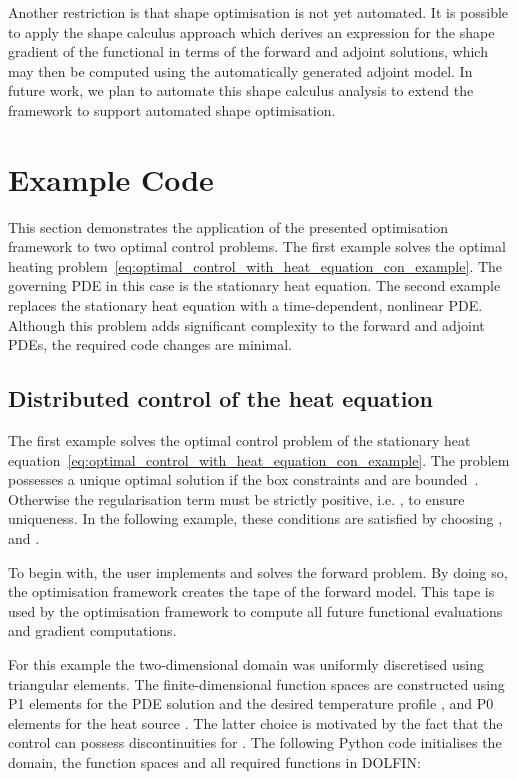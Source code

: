 \documentclass[prodmode,acmtoms]{acmsmall}
\newcommand{\dolfin}{{\mbox{DOLFIN}}\xspace}
\newcommand{\ponecg}{\mbox{P1}\xspace}
\newcommand{\pzerodg}{\mbox{P0}\xspace}
\begin{document}
Another restriction is that shape optimisation is not yet automated. It is possible to apply the shape
calculus approach \cite{schmidt2010,schmidt2011b} which derives an expression for the shape gradient
of the functional in terms of the forward and adjoint solutions, which may then be computed using the
automatically generated adjoint model. In future work, we plan to automate this shape calculus analysis
to extend the framework to support automated shape optimisation.

\section{Example Code}\label{sec:examples}
This section demonstrates the application of the presented optimisation framework to two optimal control problems.
The first example solves the optimal heating problem~\eqref{eq:optimal_control_with_heat_equation_con_example}. 
The governing PDE in this case is the stationary heat equation.
The second example replaces the stationary heat equation with a time-dependent, nonlinear PDE. 
Although this problem adds significant complexity to the forward and adjoint PDEs, 
the required code changes are minimal.

\subsection{Distributed control of the heat equation}\label{distributed_control_of_the_heat_equation}


The first example solves the optimal control problem of the stationary heat equation~\eqref{eq:optimal_control_with_heat_equation_con_example}.
The problem possesses a unique optimal solution if the box constraints  and  are bounded~\cite[chapter 2.5.1]{troeltzsch2005}.
Otherwise the regularisation term must be strictly positive, i.e. , to ensure uniqueness.
In the following example, these conditions are satisfied by choosing ,  and .

To begin with, the user implements and solves the forward problem.
By doing so, the optimisation framework creates the tape of the forward model.
This tape is used by the optimisation framework to compute all future functional evaluations and gradient computations. 

For this example the two-dimensional domain  was uniformly discretised using triangular elements. 
The finite-dimensional function spaces are constructed using \ponecg elements for the PDE solution  and the desired temperature profile , and \pzerodg elements for the heat source .
The latter choice is motivated by the fact that the control can possess discontinuities for .
The following Python code initialises the domain, the function spaces and all required functions in \dolfin:
\end{document}
